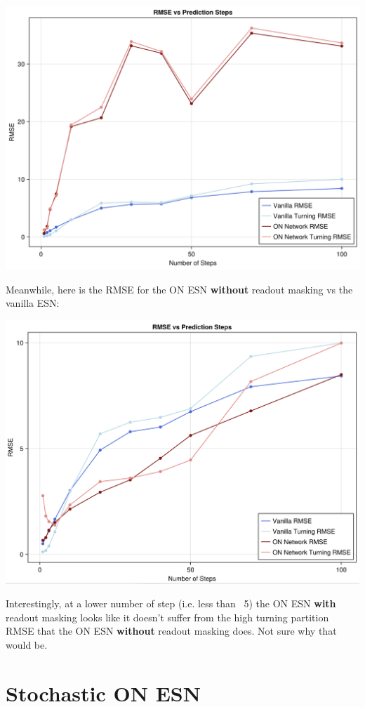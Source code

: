 \documentclass[a4paper,12pt]{article}
\begin{document}
\includegraphics[width=\textwidth]{figure_9.png}


Meanwhile, here is the RMSE for the ON ESN \textbf{without} readout masking vs the vanilla ESN:

\includegraphics[width=\textwidth]{figure_10.png}


Interestingly, at a lower number of step (i.e. less than ~5) the ON ESN \textbf{with} readout masking looks like it doesn't suffer from the high turning partition RMSE that the ON ESN \textbf{without} readout masking does. Not sure why that would be.



\section{Stochastic ON ESN}
\end{document}
